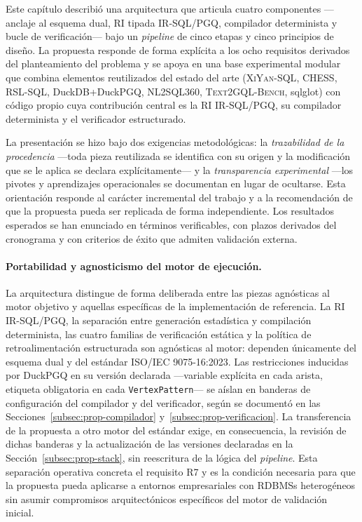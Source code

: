 Este capítulo describió una arquitectura que articula cuatro componentes ---anclaje al esquema dual, \ac{RI} tipada IR-SQL/PGQ, compilador determinista y bucle de verificación--- bajo un \emph{pipeline} de cinco etapas y cinco principios de diseño. La propuesta responde de forma explícita a los ocho requisitos derivados del planteamiento del problema y se apoya en una base experimental modular que combina elementos reutilizados del estado del arte (\textsc{XiYan-SQL}, \textsc{CHESS}, \textsc{RSL-SQL}, DuckDB+DuckPGQ, \textsc{NL2SQL360}, \textsc{Text2GQL-Bench}, sqlglot) con código propio cuya contribución central es la \ac{RI} IR-SQL/PGQ, su compilador determinista y el verificador estructurado. %

La presentación se hizo bajo dos exigencias metodológicas: la \emph{trazabilidad de la procedencia} ---toda pieza reutilizada se identifica con su origen y la modificación que se le aplica se declara explícitamente--- y la \emph{transparencia experimental} ---los pivotes y aprendizajes operacionales se documentan en lugar de ocultarse. Esta orientación responde al carácter incremental del trabajo y a la recomendación de que la propuesta pueda ser replicada de forma independiente. Los resultados esperados se han enunciado en términos verificables, con plazos derivados del cronograma y con criterios de éxito que admiten validación externa.

\paragraph{Portabilidad y agnosticismo del motor de ejecución.} La arquitectura distingue de forma deliberada entre las piezas agnósticas al motor objetivo y aquellas específicas de la implementación de referencia. La \ac{RI} IR-SQL/PGQ, la separación entre generación estadística y compilación determinista, las cuatro familias de verificación estática y la política de retroalimentación estructurada son agnósticas al motor: dependen únicamente del esquema dual y del estándar ISO/IEC 9075-16:2023. Las restricciones inducidas por DuckPGQ en su versión declarada ---variable explícita en cada arista, etiqueta obligatoria en cada \texttt{VertexPattern}--- se aíslan en banderas de configuración del compilador y del verificador, según se documentó en las Secciones~\ref{subsec:prop-compilador} y~\ref{subsec:prop-verificacion}. La transferencia de la propuesta a otro motor del estándar exige, en consecuencia, la revisión de dichas banderas y la actualización de las versiones declaradas en la Sección~\ref{subsec:prop-stack}, sin reescritura de la lógica del \emph{pipeline}. Esta separación operativa concreta el requisito R7 y es la condición necesaria para que la propuesta pueda aplicarse a entornos empresariales con \acp{RDBMS} heterogéneos sin asumir compromisos arquitectónicos específicos del motor de validación inicial.

